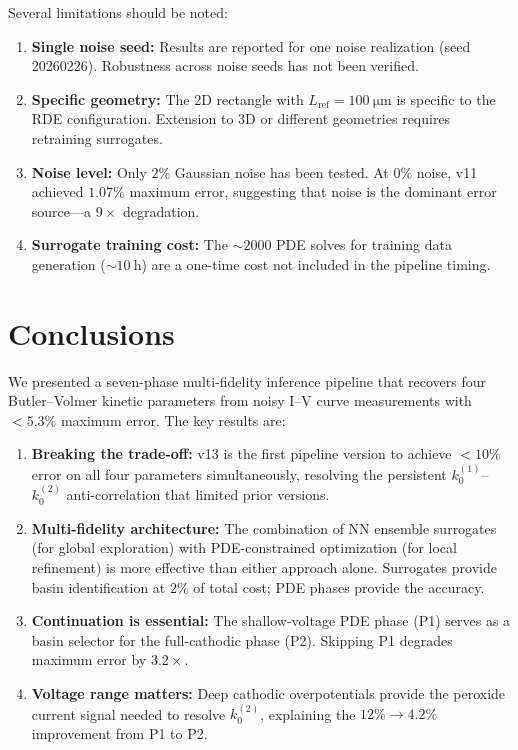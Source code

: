 \documentclass[11pt,a4paper]{article}
\newcommand{\kzero}{k_0}
\begin{document}
Several limitations should be noted:
\begin{enumerate}
  \item \textbf{Single noise seed:} Results are reported for one noise
    realization (seed 20260226). Robustness across noise seeds has not
    been verified.
  \item \textbf{Specific geometry:} The 2D rectangle with $L_{\mathrm{ref}}
    = \SI{100}{\micro\metre}$ is specific to the RDE configuration.
    Extension to 3D or different geometries requires retraining surrogates.
  \item \textbf{Noise level:} Only $2\%$ Gaussian noise has been tested.
    At $0\%$ noise, v11 achieved $1.07\%$ maximum error, suggesting that
    noise is the dominant error source---a $9\times$ degradation.
  \item \textbf{Surrogate training cost:} The $\sim\!2000$ PDE solves for
    training data generation ($\sim\!\SI{10}{\hour}$) are a one-time cost
    not included in the pipeline timing.
\end{enumerate}


\section{Conclusions}\label{sec:conclusions}

We presented a seven-phase multi-fidelity inference pipeline that
recovers four Butler--Volmer kinetic parameters from noisy I--V curve
measurements with $< 5.3\%$ maximum error. The key results are:

\begin{enumerate}
  \item \textbf{Breaking the trade-off:} v13 is the first pipeline version
    to achieve $< 10\%$ error on all four parameters simultaneously,
    resolving the persistent $\kzero^{(1)}$--$\kzero^{(2)}$
    anti-correlation that limited prior versions.
  \item \textbf{Multi-fidelity architecture:} The combination of NN
    ensemble surrogates (for global exploration) with PDE-constrained
    optimization (for local refinement) is more effective than either
    approach alone. Surrogates provide basin identification at $2\%$ of
    total cost; PDE phases provide the accuracy.
  \item \textbf{Continuation is essential:} The shallow-voltage PDE phase
    (P1) serves as a basin selector for the full-cathodic phase (P2).
    Skipping P1 degrades maximum error by $3.2\times$.
  \item \textbf{Voltage range matters:} Deep cathodic overpotentials
    provide the peroxide current signal needed to resolve $\kzero^{(2)}$,
    explaining the $12\% \to 4.2\%$ improvement from P1 to P2.
\end{enumerate}
\end{document}
